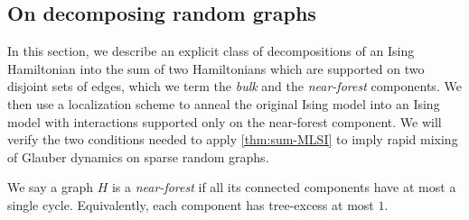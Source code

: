 \documentclass[11pt,letterpaper]{article}
\begin{document}

\subsection{On decomposing random graphs}
\label{sec:decomposition}
    In this section, we describe an explicit class of decompositions of an Ising Hamiltonian into the sum of two Hamiltonians which are supported on two disjoint sets of edges, which we term the \emph{bulk} and the \emph{near-forest} components. 
    We then use a localization scheme to anneal the original Ising model into an Ising model with interactions supported only on the near-forest component.
    We will verify the two conditions needed to apply \cref{thm:sum-MLSI} to imply rapid mixing of Glauber dynamics on sparse random graphs.

    \begin{definition}
        We say a graph $H$ is a \emph{near-forest} if all its connected components have at most a single cycle. Equivalently, each component has tree-excess at most $1$.
    \end{definition}
\end{document}
